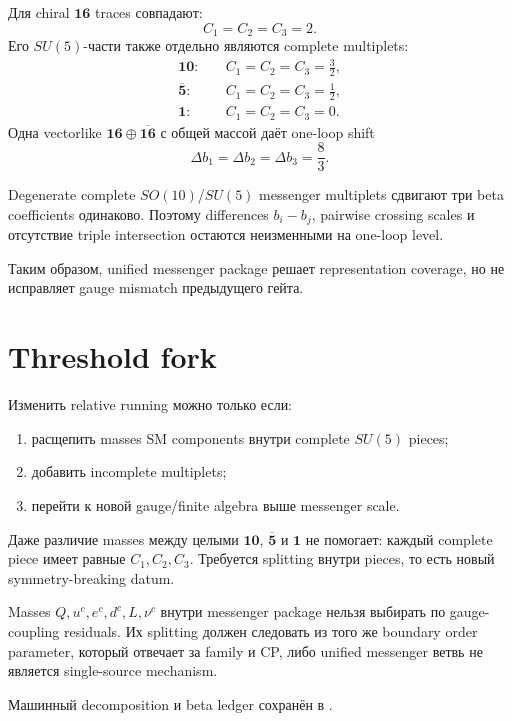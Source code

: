 Для chiral \(\mathbf{16}\) traces совпадают:
\begin{equation}
C_1=C_2=C_3=2.
\end{equation}
Его \(SU(5)\)-части также отдельно являются complete multiplets:
\begin{align}
\mathbf{10}:&\quad C_1=C_2=C_3=\frac32,\\
\overline{\mathbf5}:&\quad C_1=C_2=C_3=\frac12,\\
\mathbf1:&\quad C_1=C_2=C_3=0.
\end{align}
Одна vectorlike \(\mathbf{16}\oplus\overline{\mathbf{16}}\) с общей массой
даёт one-loop shift
\begin{equation}
\Delta b_1=\Delta b_2=\Delta b_3=\frac83.
\end{equation}

\begin{theorem}
Degenerate complete \(SO(10)\)/\(SU(5)\) messenger multiplets сдвигают три
beta coefficients одинаково. Поэтому differences \(b_i-b_j\), pairwise
crossing scales и отсутствие triple intersection остаются неизменными на
one-loop level.
\end{theorem}

Таким образом, unified messenger package решает representation coverage, но
не исправляет gauge mismatch предыдущего гейта.

\section{Threshold fork}

Изменить relative running можно только если:
\begin{enumerate}
\item расщепить masses SM components внутри complete \(SU(5)\) pieces;
\item добавить incomplete multiplets;
\item перейти к новой gauge/finite algebra выше messenger scale.
\end{enumerate}
Даже различие masses между целыми \(\mathbf{10}\),
\(\overline{\mathbf5}\) и \(\mathbf1\) не помогает: каждый complete piece
имеет равные \(C_1,C_2,C_3\). Требуется splitting внутри pieces, то есть новый
symmetry-breaking datum.

\begin{nogocriterion}
Masses \(Q,u^c,e^c,d^c,L,\nu^c\) внутри messenger package нельзя выбирать по
gauge-coupling residuals. Их splitting должен следовать из того же boundary
order parameter, который отвечает за family и CP, либо unified messenger
ветвь не является single-source mechanism.
\end{nogocriterion}

Машинный decomposition и beta ledger сохранён в
.
